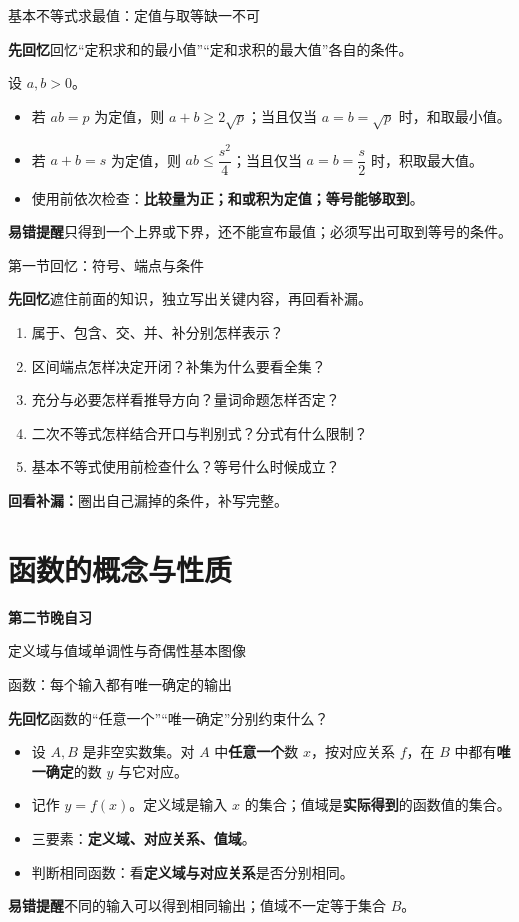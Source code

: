 \documentclass[UTF8,10pt,aspectratio=169,handout]{ctexbeamer}
\newcommand{\Recall}[1]{\par\noindent\textcolor{KnowledgeBlue}{\textbf{先回忆}\quad #1}\par\vspace{0.3cm}}
\newcommand{\Pitfall}[1]{\par\vspace{0.22cm}\noindent\textbf{易错提醒}\quad #1\par}
\newcommand{\Session}[3]{\section{#2}\begin{frame}\vspace{0.7cm}\begin{center}{\Large\bfseries 第#1节晚自习}\par\vspace{0.5cm}{\LARGE\bfseries #2}\par\vspace{0.6cm}#3\end{center}\end{frame}}
\begin{document}
\begin{frame}[t]{基本不等式求最值：定值与取等缺一不可}
\large
\Recall{回忆“定积求和的最小值”“定和求积的最大值”各自的条件。}
\pause
设 $a,b>0$。
\begin{itemize}
  \item 若 $ab=p$ 为定值，则 $a+b\ge2\sqrt p$；当且仅当 $a=b=\sqrt p$ 时，和取最小值。
  \item 若 $a+b=s$ 为定值，则 $ab\le\dfrac{s^2}{4}$；当且仅当 $a=b=\dfrac{s}{2}$ 时，积取最大值。
  \item 使用前依次检查：\textbf{比较量为正；和或积为定值；等号能够取到}。
\end{itemize}
\Pitfall{只得到一个上界或下界，还不能宣布最值；必须写出可取到等号的条件。}
\end{frame}


\begin{frame}[t]{第一节回忆：符号、端点与条件}
\Recall{遮住前面的知识，独立写出关键内容，再回看补漏。}
\begin{enumerate}
\item 属于、包含、交、并、补分别怎样表示？
\item 区间端点怎样决定开闭？补集为什么要看全集？
\item 充分与必要怎样看推导方向？量词命题怎样否定？
\item 二次不等式怎样结合开口与判别式？分式有什么限制？
\item 基本不等式使用前检查什么？等号什么时候成立？
\end{enumerate}
\pause
\par\vspace{0.2cm}\textbf{回看补漏：}圈出自己漏掉的条件，补写完整。
\end{frame}

\Session{二}{函数的概念与性质}{定义域与值域\quad 单调性与奇偶性\quad 基本图像}


\begin{frame}[t]{函数：每个输入都有唯一确定的输出}
\large
\Recall{函数的“任意一个”“唯一确定”分别约束什么？}
\pause
\begin{itemize}
  \item 设 $A,B$ 是非空实数集。对 $A$ 中\textbf{任意一个}数 $x$，按对应关系 $f$，在 $B$ 中都有\textbf{唯一确定}的数 $y$ 与它对应。
  \item 记作 $y=f(x)$。定义域是输入 $x$ 的集合；值域是\textbf{实际得到}的函数值的集合。
  \item 三要素：\textbf{定义域、对应关系、值域}。
  \item 判断相同函数：看\textbf{定义域与对应关系}是否分别相同。
\end{itemize}
\Pitfall{不同的输入可以得到相同输出；值域不一定等于集合 $B$。}
\end{frame}
\end{document}
